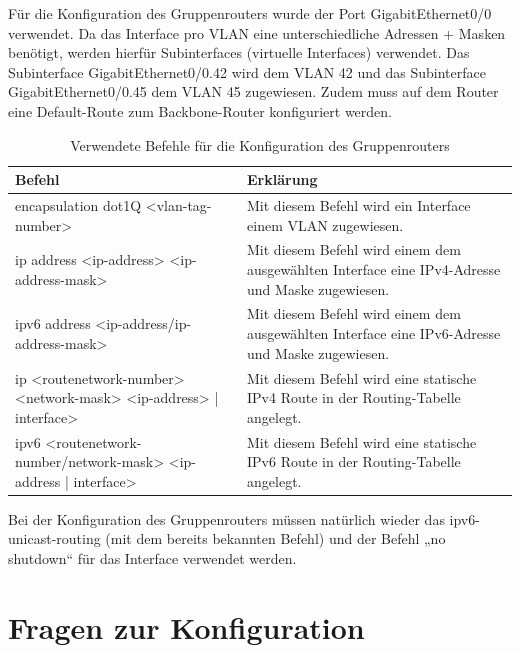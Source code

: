 \documentclass{article}
\begin{document}
Für die Konfiguration des Gruppenrouters wurde der Port GigabitEthernet0/0 verwendet. Da das Interface pro VLAN eine unterschiedliche Adressen + Masken benötigt, werden hierfür Subinterfaces (virtuelle Interfaces) verwendet. Das Subinterface GigabitEthernet0/0.42 wird dem VLAN 42 und das Subinterface GigabitEthernet0/0.45 dem VLAN 45 zugewiesen. Zudem muss auf dem Router eine Default-Route zum Backbone-Router konfiguriert werden.

\begin{table}[htbp]
    \centering
    \begin{tabularx}{\textwidth}{|X|X|}
        \toprule
        \textbf{Befehl} & \textbf{Erklärung} \\
        \midrule
        encapsulation dot1Q <vlan-tag-number> & Mit diesem Befehl wird ein Interface einem VLAN zugewiesen.\\
        \hline
        ip address <ip-address> <ip-address-mask> & Mit diesem Befehl wird einem dem ausgewählten Interface eine IPv4-Adresse und Maske zugewiesen.\\
        \hline
        ipv6 address <ip-address/ip-address-mask> & Mit diesem Befehl wird einem dem ausgewählten Interface eine IPv6-Adresse und Maske zugewiesen.\\
        \hline
        ip <routenetwork-number> <network-mask> <ip-address> | interface> & Mit diesem Befehl wird eine statische IPv4 Route in der Routing-Tabelle angelegt.\\
        \hline
        ipv6 <routenetwork-number/network-mask> <ip-address | interface> & Mit diesem Befehl wird eine statische IPv6 Route in der Routing-Tabelle angelegt.\\
        \bottomrule
    \end{tabularx}
    \caption{Verwendete Befehle für die Konfiguration des Gruppenrouters}
    \label{tab:commands}
\end{table}
\noindent Bei der Konfiguration des Gruppenrouters müssen natürlich wieder das ipv6-unicast-routing (mit dem bereits bekannten Befehl) und der Befehl „no shutdown“ für das Interface verwendet werden.

\section{Fragen zur Konfiguration}
\end{document}
